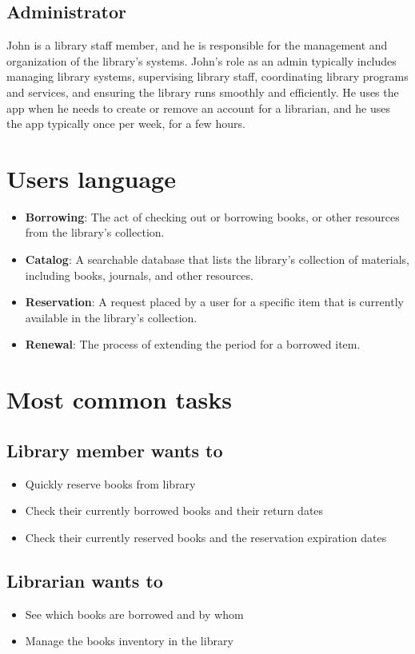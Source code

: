 \documentclass[11pt,twoside,a4paper]{article}
\begin{document}
\subsection*{Administrator}
John is a library staff member, and he is responsible for the management and
organization of the library's systems. John's role as an admin typically
includes managing library systems, supervising library staff, coordinating
library programs and services, and ensuring the library runs smoothly and
efficiently. He uses the app when he needs to create or remove an account for
a librarian, and he uses the app typically once per week, for a few hours.

\section{Users language}
\begin{itemize}
    \item \textbf{Borrowing}: The act of checking out or borrowing books, or other resources from the library's collection.
    \item \textbf{Catalog}: A searchable database that lists the library's collection of materials, including books, journals, and other resources.
    \item \textbf{Reservation}: A request placed by a user for a specific item that is currently available in the library's collection.
    \item \textbf{Renewal}: The process of extending the period for a borrowed item.
\end{itemize}

\section{Most common tasks}

\subsection*{Library member wants to}
\begin{itemize}
    \item Quickly reserve books from library
    \item Check their currently borrowed books and their return dates
    \item Check their currently reserved books and the reservation expiration dates
\end{itemize}

\subsection*{Librarian wants to}
\begin{itemize}
    \item See which books are borrowed and by whom
    \item Manage the books inventory in the library
\end{itemize}
\end{document}
